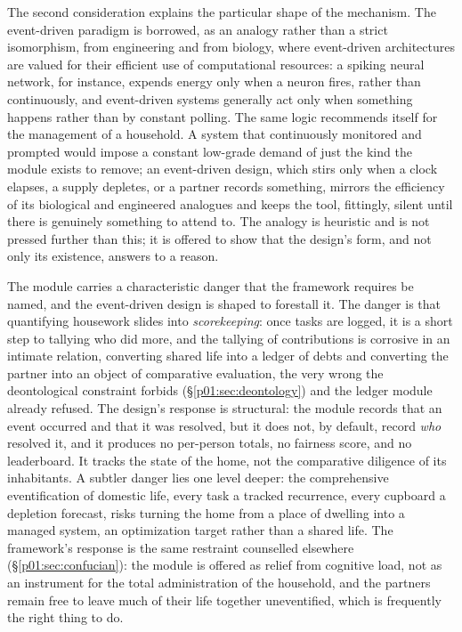 The second consideration explains the particular shape of the mechanism. The event-driven paradigm is borrowed, as an analogy rather than a strict isomorphism, from engineering and from biology, where event-driven architectures are valued for their efficient use of computational resources: a spiking neural network, for instance, expends energy only when a neuron fires, rather than continuously, and event-driven systems generally act only when something happens rather than by constant polling. The same logic recommends itself for the management of a household. A system that continuously monitored and prompted would impose a constant low-grade demand of just the kind the module exists to remove; an event-driven design, which stirs only when a clock elapses, a supply depletes, or a partner records something, mirrors the efficiency of its biological and engineered analogues and keeps the tool, fittingly, silent until there is genuinely something to attend to. The analogy is heuristic and is not pressed further than this; it is offered to show that the design's form, and not only its existence, answers to a reason.

The module carries a characteristic danger that the framework requires be named, and the event-driven design is shaped to forestall it. The danger is that quantifying housework slides into \emph{scorekeeping}: once tasks are logged, it is a short step to tallying who did more, and the tallying of contributions is corrosive in an intimate relation, converting shared life into a ledger of debts and converting the partner into an object of comparative evaluation, the very wrong the deontological constraint forbids (§\ref{p01:sec:deontology}) and the ledger module already refused. The design's response is structural: the module records that an event occurred and that it was resolved, but it does not, by default, record \emph{who} resolved it, and it produces no per-person totals, no fairness score, and no leaderboard. It tracks the state of the home, not the comparative diligence of its inhabitants. A subtler danger lies one level deeper: the comprehensive eventification of domestic life, every task a tracked recurrence, every cupboard a depletion forecast, risks turning the home from a place of dwelling into a managed system, an optimization target rather than a shared life. The framework's response is the same restraint counselled elsewhere (§\ref{p01:sec:confucian}): the module is offered as relief from cognitive load, not as an instrument for the total administration of the household, and the partners remain free to leave much of their life together uneventified, which is frequently the right thing to do.

